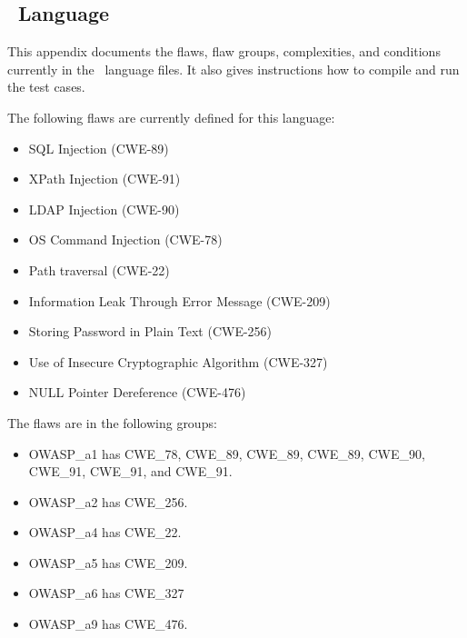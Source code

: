 \clearpage

\begin{appendices}

\section{\CSharp\ Language}
\label{sec:CSharp language}

This appendix documents the flaws, flaw groups, complexities, and conditions
currently in the
\CSharp\ language files.
It also gives instructions how to compile and run the test cases.

The following flaws are currently defined for this language:
\begin{itemize}[nosep]
    \item SQL Injection (CWE-89)
    \item XPath Injection (CWE-91)
    \item LDAP Injection (CWE-90)
    \item OS Command Injection (CWE-78)
    \item Path traversal (CWE-22)
    \item Information Leak Through Error Message (CWE-209)
    \item Storing Password in Plain Text (CWE-256)
    \item Use of Insecure Cryptographic Algorithm (CWE-327)
    \item NULL Pointer Dereference (CWE-476)
\end{itemize}

\vspace{1em}

The flaws are in the following groups:
\begin{itemize}[nosep]
    \item OWASP\_a1 has CWE\_78, CWE\_89, CWE\_89, CWE\_89, CWE\_90, CWE\_91,
      CWE\_91, and CWE\_91.
    \item OWASP\_a2 has CWE\_256.
    \item OWASP\_a4 has CWE\_22.
    \item OWASP\_a5 has CWE\_209.
    \item OWASP\_a6 has CWE\_327
    \item OWASP\_a9 has CWE\_476.
\end{itemize}


\end{appendices}
